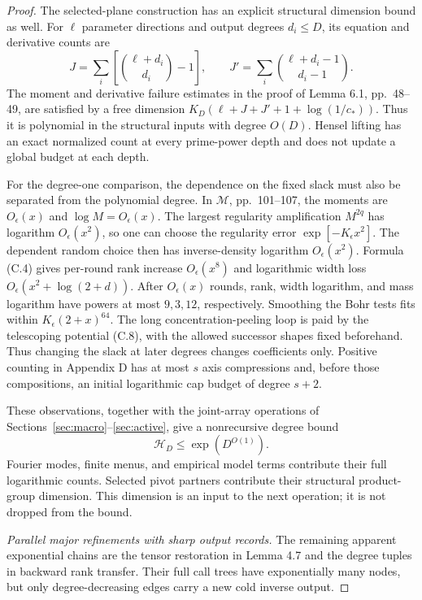 \documentclass[11pt,a4paper]{article}
\theoremstyle{definition}
\newcommand{\M}{\mathcal M}
\begin{document}
\begin{proof}
The selected-plane construction has an explicit structural
dimension bound as well. For \(\ell\) parameter directions and
output degrees \(d_i\le D\), its equation and derivative counts are
\[
 J=\sum_i\left[\binom{\ell+d_i}{d_i}-1\right],\qquad
 J'=\sum_i\binom{\ell+d_i-1}{d_i-1}.
\]
The moment and derivative failure estimates in the proof of
Lemma 6.1, pp.~48--49, are satisfied by a free dimension
\(K_D(\ell+J+J'+1+\log(1/c_*))\).
Thus it is polynomial in the structural inputs with degree
\(O(D)\). Hensel lifting has an exact normalized count at every
prime-power depth and does not update a global budget at each depth.

For the degree-one comparison, the dependence on the fixed slack
must also be separated from the polynomial degree. In \(\M\),
pp.~101--107, the moments are \(O_\epsilon(x)\) and
\(\log M=O_\epsilon(x)\). The largest regularity amplification
\(M^{2q}\) has logarithm \(O_\epsilon(x^2)\), so one can choose
the regularity error \(\exp[-K_\epsilon x^2]\). The dependent
random choice then has inverse-density logarithm
\(O_\epsilon(x^2)\). Formula (C.4) gives per-round rank increase
\(O_\epsilon(x^8)\) and logarithmic width loss
\(O_\epsilon(x^2+\log(2+d))\). After \(O_\epsilon(x)\) rounds,
rank, width logarithm, and mass logarithm have powers at most
\(9,3,12\), respectively. Smoothing the Bohr tests fits within
\(K_\epsilon(2+x)^{64}\). The long concentration-peeling loop is
paid by the telescoping potential (C.8), with the allowed successor
shapes fixed beforehand. Thus changing the slack at later degrees
changes coefficients only. Positive counting in Appendix D has
at most \(s\) axis compressions and, before those compositions,
an initial logarithmic cap budget of degree \(s+2\).

These observations, together with the joint-array operations of
Sections~\ref{sec:macro}--\ref{sec:active}, give a nonrecursive
degree bound
\begin{equation}\label{eq:H}
 \mathcal H_D\le\exp(D^{O(1)}).
\end{equation}
Fourier modes, finite menus, and empirical model terms contribute
their full logarithmic counts. Selected pivot partners contribute
their structural product-group dimension. This dimension is an
input to the next operation; it is not dropped from the bound.

\textit{Parallel major refinements with sharp output records.}
The remaining apparent exponential chains are the tensor restoration
in Lemma 4.7 and the degree tuples in backward rank transfer.
Their full call trees have exponentially many nodes, but only
degree-decreasing edges carry a new cold inverse output.


\end{proof}
\end{document}
